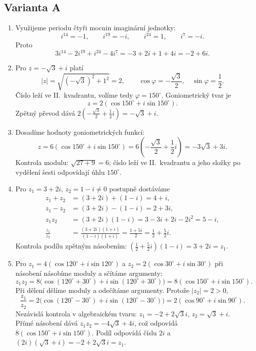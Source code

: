 \documentclass[a4paper,10pt]{article}
\begin{document}
\subsection*{Varianta A}
\begin{enumerate}
\item Využijeme periodu čtyři mocnin imaginární jednotky:
\[
i^{14}=-1,\qquad i^{19}=-i,\qquad i^{24}=1,\qquad i^7=-i.
\]
Proto
\[
3i^{14}-2i^{19}+i^{24}-4i^7
=-3+2i+1+4i=-2+6i.
\]

\item Pro $z=-\sqrt3+i$ platí
\[
|z|=\sqrt{(-\sqrt3)^2+1^2}=2,\qquad
\cos\varphi=-\frac{\sqrt3}{2},\quad \sin\varphi=\frac12.
\]
Číslo leží ve II.~kvadrantu, volíme tedy $\varphi=150^\circ$.
Goniometrický tvar je
\[
z=2(\cos150^\circ+i\sin150^\circ).
\]
Zpětný převod dává $2(-\frac{\sqrt3}{2}+\frac12i)=-\sqrt3+i$.

\item Dosadíme hodnoty goniometrických funkcí:
\[
z=6(\cos150^\circ+i\sin150^\circ)
=6\left(-\frac{\sqrt3}{2}+\frac12i\right)=-3\sqrt3+3i.
\]
Kontrola modulu: $\sqrt{27+9}=6$; číslo leží ve II.~kvadrantu
a jeho složky po vydělení šesti odpovídají úhlu $150^\circ$.

\item Pro $z_1=3+2i$, $z_2=1-i\neq0$ postupně dostáváme
\begin{align*}
z_1+z_2&=(3+2i)+(1-i)=4+i,\\
z_1-z_2&=(3+2i)-(1-i)=2+3i,\\
z_1z_2&=(3+2i)(1-i)=3-3i+2i-2i^2=5-i,\\
\frac{z_1}{z_2}
&=\frac{(3+2i)(1+i)}{(1-i)(1+i)}
=\frac{1+5i}{2}=\frac12+\frac52i.
\end{align*}
Kontrola podílu zpětným násobením:
$(\frac12+\frac52i)(1-i)=3+2i=z_1$.

\item Pro $z_1=4(\cos120^\circ+i\sin120^\circ)$ a
$z_2=2(\cos30^\circ+i\sin30^\circ)$
při násobení násobíme moduly a sčítáme argumenty:
\[
z_1z_2=8\bigl(\cos(120^\circ+30^\circ)+i\sin(120^\circ+30^\circ)\bigr)
=8(\cos150^\circ+i\sin150^\circ).
\]
Při dělení dělíme moduly a odečítáme argumenty. Protože $|z_2|=2>0$,
\[
\frac{z_1}{z_2}
=2\bigl(\cos(120^\circ-30^\circ)+i\sin(120^\circ-30^\circ)\bigr)
=2(\cos90^\circ+i\sin90^\circ).
\]
Nezávislá kontrola v algebraickém tvaru:
$z_1=-2+2\sqrt3i$, $z_2=\sqrt3+i$.
Přímé násobení dává $z_1z_2=-4\sqrt3+4i$, což odpovídá
$8(\cos150^\circ+i\sin150^\circ)$.
Podíl odpovídá číslu $2i$ a $(2i)(\sqrt3+i)=-2+2\sqrt3i=z_1$.
\end{enumerate}
\end{document}
